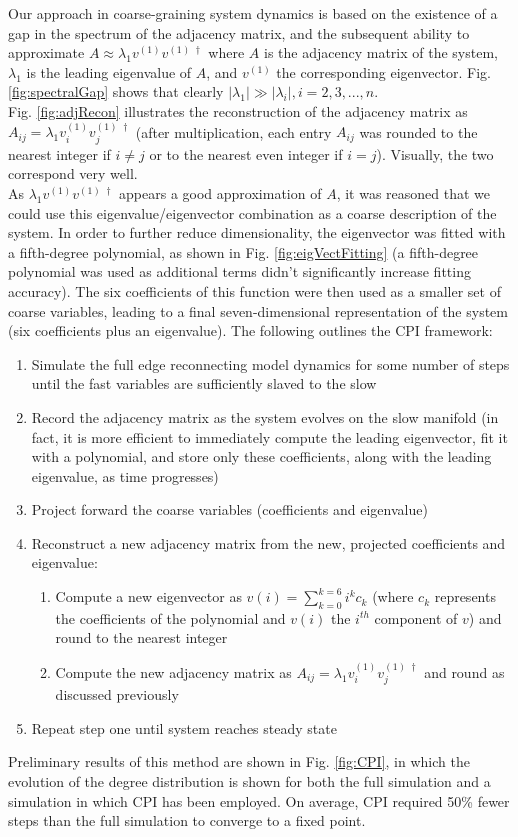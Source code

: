 \documentclass[11pt]{article}
\begin{document}
Our approach in coarse-graining system dynamics is based on the existence of a gap in the spectrum of the adjacency matrix, and the subsequent ability to approximate $A\approx \lambda_{1}v^{(1)}v^{(1) \;\dagger}$ where $A$ is the adjacency matrix of the system, $\lambda_{1}$ is the leading eigenvalue of $A$, and $v^{(1)}$ the corresponding eigenvector. Fig. \ref{fig:spectralGap} shows that clearly $|\lambda_{1}| \gg |\lambda_{i}|, i=2,3,...,n$. \\
Fig. \ref{fig:adjRecon} illustrates the reconstruction of the adjacency matrix as $A_{ij}=\lambda_{1}v^{(1)}_{i}v^{(1) \;\dagger}_{j}$ (after multiplication, each entry $A_{ij}$ was rounded to the nearest integer if $i\neq j$ or to the nearest even integer if $i=j$). Visually, the two correspond very well. \\
As $\lambda_{1}v^{(1)}v^{(1) \;\dagger}$ appears a good approximation of $A$, it was reasoned that we could use this eigenvalue/eigenvector combination as a coarse description of the system. In order to further reduce dimensionality, the eigenvector was fitted with a fifth-degree polynomial, as shown in Fig. \ref{fig:eigVectFitting} (a fifth-degree polynomial was used as additional terms didn't significantly increase fitting accuracy). The six coefficients of this function were then used as a smaller set of coarse variables, leading to a final seven-dimensional representation of the system (six coefficients plus an eigenvalue). The following outlines the CPI framework:
\begin{enumerate}
\item Simulate the full edge reconnecting model dynamics for some number of steps until the fast variables are sufficiently slaved to the slow
\item Record the adjacency matrix as the system evolves on the slow manifold (in fact, it is more efficient to immediately compute the leading eigenvector, fit it with a polynomial, and store only these coefficients, along with the leading eigenvalue, as time progresses)
\item Project forward the coarse variables (coefficients and eigenvalue)
\item Reconstruct a new adjacency matrix from the new, projected coefficients and eigenvalue:
  \begin{enumerate}
  \item Compute a new eigenvector as $v(i) = \displaystyle\sum\limits_{k=0}^{k=6} i^{k}c_{k}$ (where $c_{k}$ represents the coefficients of the polynomial and $v(i)$ the $i^{th}$ component of $v$) and round to the nearest integer
  \item Compute the new adjacency matrix as $A_{ij}=\lambda_{1}v^{(1)}_{i}v^{(1) \;\dagger}_{j}$ and round as discussed previously
  \end{enumerate}
\item Repeat step one until system reaches steady state
\end{enumerate}
Preliminary results of this method are shown in Fig. \ref{fig:CPI}, in which the evolution of the degree distribution is shown for both the full simulation and a simulation in which CPI has been employed. On average, CPI required 50\% fewer steps than the full simulation to converge to a fixed point.
\end{document}
